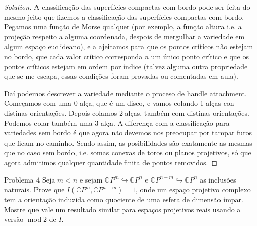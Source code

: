 \begin{proof}[Solution]\leavevmode


A classificação das superfícies compactas com bordo pode ser feita do mesmo jeito que fizemos a classificação das superfícies compactas com bordo. Pegamos uma função de Morse qualquer (por exemplo, a função altura i.e. a projeção respeito a alguma coordenada, despois de mergulhar a variedade em algum espaço euclideano), e a ajeitamos para que os pontos críticos não estejam no bordo, que cada valor crítico corresponda a um único ponto crítico e que os pontos críticos estejam em ordem por índice (talvez alguma outra propriedade que se me escapa, essas condições foram provadas ou comentadas em aula).

Daí podemos descrever a variedade mediante o proceso de handle attachment. Começamos com uma 0-alça, que é um disco, e vamos colando 1 alças con distinas orientações. Depois colamos 2-alças, também com distinas orientações. Podemos colar também uma 3-alça. A diferença com a classificação para variedades sem bordo é que agora não devemos nos preocupar por tampar furos que ficam no caminho. Sendo assim, as posibilidades são exatamente as mesmas que no caso sem bordo, i.e. somas conexas de toros ou planos projetivos, só que agora admitimos qualquer quantidade finita de pontos removidos.

\end{proof}

\begin{thing1}{Problema 4}\label{prob:a 4}\leavevmode
Seja \(m<n\) e sejam \(\mathbb{C}P^{m}\hookrightarrow \mathbb{C}P^{n}\) e \(\mathbb{C}P^{n-m}\hookrightarrow \mathbb{C}P^{n}\) as inclusões naturais. Prove que \(I(\mathbb{C}P^{m},\mathbb{C}P^{n-m})=1\), onde um espaço projetivo complexo tem a orientação induzida como quociente de uma esfera de dimensão ímpar. Mostre que vale um resultado similar para espaços projetivos reais usando a versão \(\operatorname{mod}2\) de \(I\).
\end{thing1}


